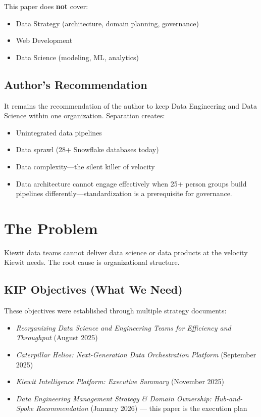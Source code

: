 \documentclass[12pt, a4paper]{article}
\begin{document}
\noindent This paper does \textbf{not} cover:
\begin{itemize}
    \item Data Strategy (architecture, domain planning, governance)
    \item Web Development
    \item Data Science (modeling, ML, analytics)
\end{itemize}

\subsection{Author's Recommendation}
It remains the recommendation of the author to keep Data Engineering and Data Science within one organization. Separation creates:
\begin{itemize}
    \item Unintegrated data pipelines
    \item Data sprawl (28+ Snowflake databases today)
    \item Data complexity—the silent killer of velocity
    \item Data architecture cannot engage effectively when 25+ person groups build pipelines differently—standardization is a prerequisite for governance.
\end{itemize}

\section{The Problem}
Kiewit data teams cannot deliver data science or data products at the velocity Kiewit needs. The root cause is organizational structure.

\subsection{KIP Objectives (What We Need)}
These objectives were established through multiple strategy documents:
\begin{itemize}
    \item \textit{Reorganizing Data Science and Engineering Teams for Efficiency and Throughput} (August 2025)
    \item \textit{Caterpillar Helios: Next-Generation Data Orchestration Platform} (September 2025)
    \item \textit{Kiewit Intelligence Platform: Executive Summary} (November 2025)
    \item \textit{Data Engineering Management Strategy \& Domain Ownership: Hub-and-Spoke Recommendation} (January 2026) — this paper is the execution plan
\end{itemize}
\end{document}

